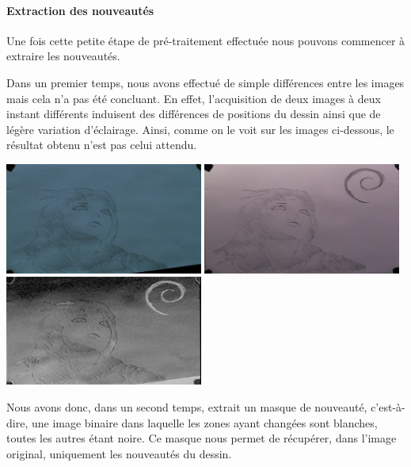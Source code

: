 \paragraph{Extraction des nouveautés\\}
Une fois cette petite étape de pré-traitement effectuée nous pouvons commencer à extraire les nouveautés.

Dans un premier temps, nous avons effectué de simple différences entre les images mais cela n'a pas été concluant. En effet, l'acquisition de deux images à deux instant différents induisent des différences de positions du dessin ainsi que de légère variation d'éclairage. Ainsi, comme on le voit sur les images ci-dessous, le résultat obtenu n'est pas celui attendu. 

\begin{center}
\includegraphics[width=6.5cm]{images/capImage1-7.png}
\includegraphics[width=6.5cm]{images/capImage1-9.png}
\hfill\includegraphics[width=6.5cm]{images/simpleDiff.png}\newline
{}
\end{center}

Nous avons donc, dans un second temps, extrait un masque de nouveauté, c'est-à-dire, une image binaire dans laquelle les zones ayant changées sont blanches, toutes les autres étant noire. Ce masque nous permet de récupérer, dans l'image original, uniquement les nouveautés du dessin.


